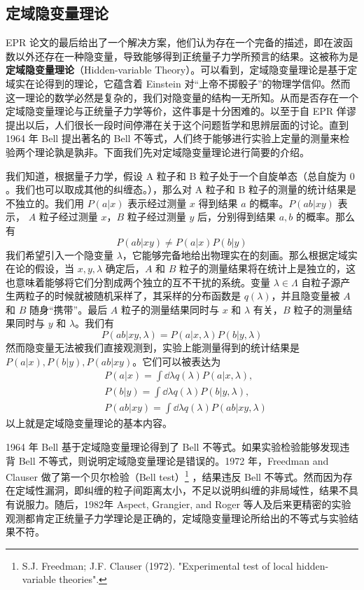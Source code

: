\subsection{定域隐变量理论}
EPR 论文的最后给出了一个解决方案，他们认为存在一个完备的描述，即在波函数以外还存在一种隐变量，导致能够得到正统量子力学所预言的结果。这被称为是\textbf{定域隐变量理论}（Hidden-variable Theory）。可以看到，定域隐变量理论是基于定域实在论得到的理论，它蕴含着 Einstein 对“上帝不掷骰子”的物理学信仰。然而这一理论的数学必然是复杂的，我们对隐变量的结构一无所知。从而是否存在一个定域隐变量理论与正统量子力学等价，这件事是十分困难的。以至于自 EPR 佯谬提出以后，人们很长一段时间停滞在关于这个问题哲学和思辨层面的讨论。直到 1964 年 Bell 提出著名的 Bell 不等式，人们终于能够进行实验上定量的测量来检验两个理论孰是孰非。下面我们先对定域隐变量理论进行简要的介绍。

我们知道，根据量子力学，假设 A 粒子和 B 粒子处于一个自旋单态（总自旋为 $0$。我们也可以取成其他的纠缠态。），那么对 A 粒子和 B 粒子的测量的统计结果是不独立的。我们用 $P(a | x)$ 表示经过测量 $x$ 得到结果 $a$ 的概率。$P(ab | xy)$ 表示， $A$ 粒子经过测量 $x$，$B$ 粒子经过测量 $y$ 后，分别得到结果 $a,b$ 的概率。那么有
\begin{equation}
P(ab|xy)\neq P(a|x)P(b|y)
\end{equation}
我们希望引入一个隐变量 $\lambda$，它能够完备地给出物理实在的刻画。那么根据定域实在论的假设，当 $x,y,\lambda$ 确定后，$A$ 和 $B$ 粒子的测量结果将在统计上是独立的，这也意味着能够将它们分割成两个独立的互不干扰的系统。变量 $\lambda\in \Lambda$ 自粒子源产生两粒子的时候就被随机采样了，其采样的分布函数是 $q(\lambda)$，并且隐变量被 $A$ 和 $B$ 随身“携带”。最后 $A$ 粒子的测量结果同时与 $x$ 和 $\lambda$ 有关，$B$ 粒子的测量结果同时与 $y$ 和 $\lambda$。我们有
\begin{equation}
P(ab|xy,\lambda)=P(a|x,\lambda)P(b|y,\lambda)
\end{equation}
然而隐变量无法被我们直接观测到，实验上能测量得到的统计结果是 $P(a|x),P(b|y),P(ab|xy)$。它们可以被表达为
\begin{equation}
\begin{aligned}
&P(a|x)=\int \dd \lambda q(\lambda)P(a|x,\lambda),\\
&P(b|y)=\int \dd \lambda q(\lambda)P(b|y,\lambda),\\
&P(ab|xy)=\int \dd \lambda q(\lambda)P(ab|xy,\lambda)
\end{aligned}
\end{equation}
以上就是定域隐变量理论的基本内容。

1964 年 Bell 基于定域隐变量理论得到了 Bell 不等式。如果实验检验能够发现违背 Bell 不等式，则说明定域隐变量理论是错误的。1972 年，Freedman and Clauser 做了第一个贝尔检验（Bell test）\footnote{S.J. Freedman; J.F. Clauser (1972). "Experimental test of local hidden-variable theories".} ，结果违反 Bell 不等式。然而因为存在定域性漏洞，即纠缠的粒子间距离太小，不足以说明纠缠的非局域性，结果不具有说服力。随后，1982年 Aspect, Grangier, and Roger 等人及后来更精密的实验观测都肯定正统量子力学理论是正确的，定域隐变量理论所给出的不等式与实验结果不符。
